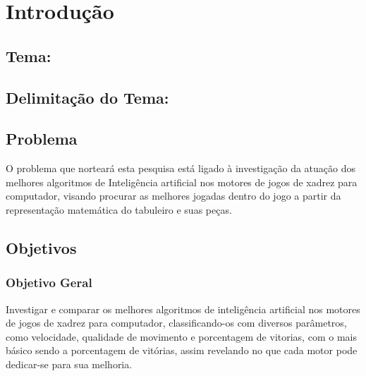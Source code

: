 

\chapter{Introdução}
\section[Tema]{Tema: {}}

\section[Delimitação do Tema]{Delimitação do Tema: {}}

\section{Problema}

O problema que norteará esta pesquisa está ligado à investigação da atuação dos melhores algoritmos de Inteligência artificial
nos motores de jogos de xadrez para computador, visando procurar as melhores jogadas dentro do jogo a partir da representação
matemática do tabuleiro e suas peças.

\section{Objetivos}

\subsection{Objetivo Geral}
Investigar e comparar os melhores algoritmos de inteligência artificial nos motores de jogos de xadrez para computador,
classificando-os com diversos parâmetros, como velocidade, qualidade de movimento e porcentagem de vitorias,
com o mais básico sendo a porcentagem de vitórias, assim revelando no que cada motor pode dedicar-se para sua melhoria.

